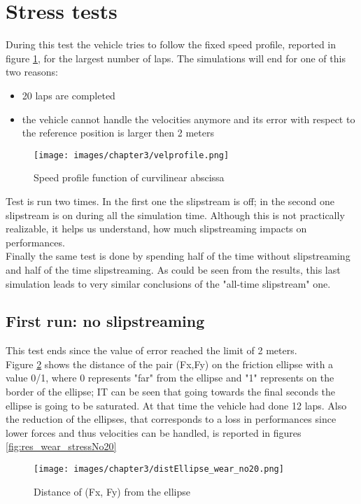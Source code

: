 \documentclass{report}
\let\Oldsection\section
\renewcommand{\section}{\FloatBarrier\Oldsection}
\let\Oldsubsection\subsection
\renewcommand{\subsection}{\FloatBarrier\Oldsubsection}
\begin{document}
\section{Stress tests}
During this test the vehicle tries to follow the fixed speed profile, reported in figure \ref{fig:res_fixedProfile}, for the largest number of laps. The simulations will end for one of this two reasons:
\begin{itemize}
    \item 20 laps are completed
    \item the vehicle cannot handle the velocities anymore and its error with respect to the reference position is larger then 2 meters
\end{itemize}

\begin{figure}[h!]
    \centering
    \texttt{[image: images/chapter3/velprofile.png]}
    \caption{Speed profile function of curvilinear abscissa}
    \label{fig:res_fixedProfile}
\end{figure}

Test is run two times. In the first one the slipstream is off; in the second one slipstream is on during all the simulation time. Although this is not practically realizable, it helps us understand, how much slipstreaming impacts on performances. 
\\Finally the same test is done by spending half of the time without slipstreaming and half of the time slipstreaming. As could be seen from the results, this last simulation leads to very similar conclusions of the "all-time slipstream" one.
\subsection{First run: no slipstreaming}
This test ends since the value of error reached the limit of 2 meters. \\Figure \ref{fig:res_distEllipse_stressNo20} shows the distance of the pair (Fx,Fy) on the friction ellipse with a value 0/1, where 0 represents "far" from the ellipse and "1" represents on the border of the ellipse; IT can be seen that going towards the final seconds the ellipse is going to be saturated. At that time the vehicle had done 12 laps. Also the reduction of the ellipses, that corresponds to a loss in performances since lower forces and thus velocities can be handled, is reported in figures \ref{fig:res_wear_stressNo20}

\begin{figure}[h!]
    \centering
    \texttt{[image: images/chapter3/distEllipse\_wear\_no20.png]}
    \caption{Distance of (Fx, Fy) from the ellipse}
    \label{fig:res_distEllipse_stressNo20}
\end{figure}
\end{document}
